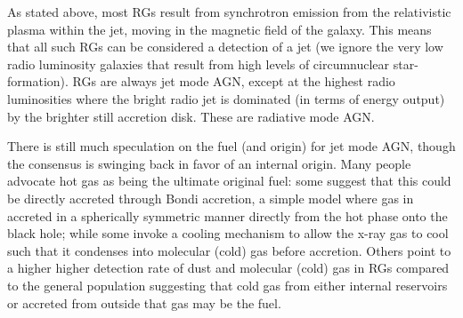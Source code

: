 		As stated above, most RGs result from synchrotron emission from the relativistic plasma within the jet, moving in the magnetic field of the galaxy. This means that all such RGs can be considered a detection of a jet (we ignore the very low radio luminosity galaxies that result from high levels of circumnuclear star-formation). RGs are always jet mode AGN, except at the highest radio luminosities where the bright radio jet is dominated (in terms of energy output) by the brighter still accretion disk. These are radiative mode AGN.

		There is still much speculation on the fuel (and origin) for jet mode AGN, though the consensus is swinging back in favor of an internal origin. Many people advocate hot gas as being the ultimate original fuel: some suggest that this could be directly accreted through Bondi accretion, a simple model where gas in accreted in a spherically symmetric manner directly from the hot phase onto the black hole; while some invoke a cooling mechanism to allow the x-ray gas to cool such that it condenses into molecular (cold) gas before accretion. Others point to a higher higher detection rate of dust and molecular (cold) gas in RGs compared to the general population suggesting that cold gas from either internal reservoirs or accreted from outside that gas may be the fuel.
